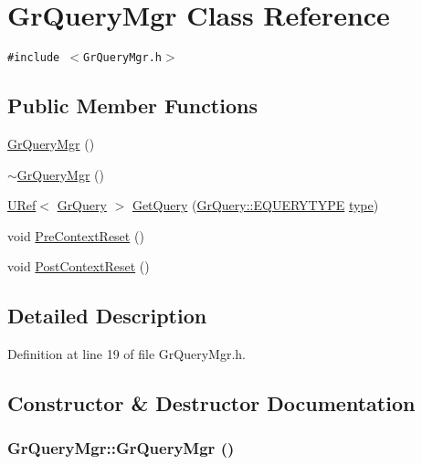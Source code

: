 \hypertarget{class_gr_query_mgr}{
\section{GrQueryMgr Class Reference}
\label{class_gr_query_mgr}
}
{\tt \#include $<$GrQueryMgr.h$>$}

\subsection*{Public Member Functions}
\begin{CompactItemize}
\item 
\hyperlink{class_gr_query_mgr_cb31db8b9243ad1a20a2644a04604130}{GrQueryMgr} ()
\item 
\hyperlink{class_gr_query_mgr_f24c1acf4e5607b6b4e3b9162e9ca29b}{$\sim$GrQueryMgr} ()
\item 
\hyperlink{class_u_ref}{URef}$<$ \hyperlink{class_gr_query}{GrQuery} $>$ \hyperlink{class_gr_query_mgr_5f3da3199e15d693b707d9df1a52cef2}{GetQuery} (\hyperlink{class_gr_query_932c1c9ceff8018b6f8420f282c2c38f}{GrQuery::EQUERYTYPE} \hyperlink{glext__bak_8h_7d05960f4f1c1b11f3177dc963a45d86}{type})
\item 
void \hyperlink{class_gr_query_mgr_30c18b0691192febe70d2e670a791451}{PreContextReset} ()
\item 
void \hyperlink{class_gr_query_mgr_7907b96bf873f4bec95328827e2a5641}{PostContextReset} ()
\end{CompactItemize}


\subsection{Detailed Description}


Definition at line 19 of file GrQueryMgr.h.

\subsection{Constructor \& Destructor Documentation}
\hypertarget{class_gr_query_mgr_cb31db8b9243ad1a20a2644a04604130}{
\subsubsection[{GrQueryMgr}]{\setlength{\rightskip}{0pt plus 5cm}GrQueryMgr::GrQueryMgr ()}}
\label{class_gr_query_mgr_cb31db8b9243ad1a20a2644a04604130}




